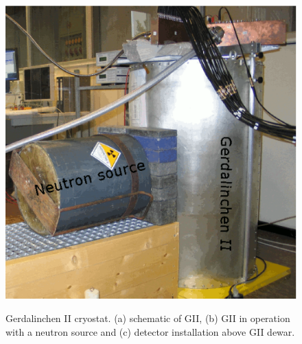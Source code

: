 \begin{figure}[tbhp]
{\includegraphics[height=0.25\textheight]{GIIneutron}}\hfil%
%
\caption{Gerdalinchen II cryostat. (a) schematic of GII, (b) GII in
operation with a neutron source and (c) detector installation above
GII dewar.}
\label{fig:tt:gii}
\end{figure}

